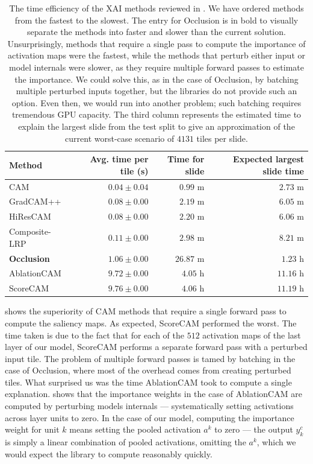 \begin{table}
\centering
{}
\begin{tabular}{@{} l @{\ }r r r @{}}\toprule
Method & Avg. time per tile (s) & Time for slide & Expected largest slide time \\ 
\midrule
CAM                 & $0.04 \pm 0.04$ & $0.99$ m   & $2.73$ m \\
GradCAM++           & $0.08 \pm 0.00$ & $2.19$ m   & $6.05$ m \\
HiResCAM            & $0.08 \pm 0.00$ & $2.20$ m   & $6.06$ m \\
Composite-LRP       & $0.11 \pm 0.00$ & $2.98$ m   & $8.21$ m \\
\textbf{Occlusion}  & $1.06 \pm 0.00$ & $26.87$ m  & $1.23$ h \\
AblationCAM         & $9.72 \pm 0.00$ & $4.05$ h   & $11.16$ h \\
ScoreCAM            & $9.76 \pm 0.00$ & $4.06$ h   & $11.19$ h \\
\bottomrule
\end{tabular}
\caption{
The time efficiency of the XAI methods reviewed in .
We have ordered methods from the fastest to the slowest.
The entry for Occlusion is in bold to visually separate the methods into faster and slower than the current solution.
Unsurprisingly, methods that require a single pass to compute the importance of activation maps were the fastest, while the methods that perturb either input or model internals were slower, as they require multiple forward passes to estimate the importance.
We could solve this, as in the case of Occlusion, by batching multiple perturbed inputs together, but the libraries do not provide such an option.
Even then, we would run into another problem; such batching requires tremendous GPU capacity.
The third column represents the estimated time to explain the largest slide from the test split to give an approximation of the current worst-case scenario of $4131$ tiles per slide.
}
\label{tab:comp-time}
\end{table}

 shows the superiority of CAM methods that require a single forward pass to compute the saliency maps.
As expected, ScoreCAM performed the worst.
The time taken is due to the fact that for each of the $512$ activation maps of the last layer of our model, ScoreCAM performs a separate forward pass with a perturbed input tile.
The problem of multiple forward passes is tamed by batching in the case of Occlusion, where most of the overhead comes from creating perturbed tiles.
What surprised us was the time AblationCAM took to compute a single explanation.
 shows that the importance weights in the case of AblationCAM are computed by perturbing models internals --- systematically setting activations across layer units to zero.
In the case of our model, computing the importance weight for unit $k$ means setting the pooled activation $a^k$ to zero --- the output $y^c_k$ is simply a linear combination of pooled activations, omitting the $a^k$, which we would expect the library to compute reasonably quickly.

